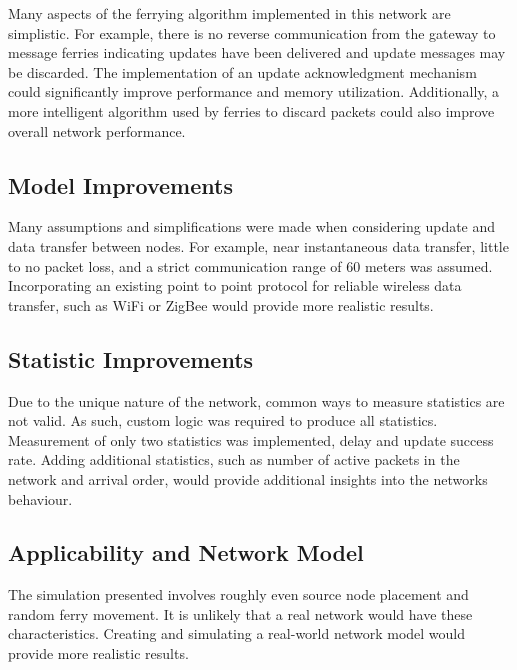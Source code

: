 Many aspects of the ferrying algorithm implemented in this network are simplistic.
For example, there is no reverse communication from the gateway to message ferries indicating updates have been delivered and update messages may be discarded.
The implementation of an update acknowledgment mechanism could significantly improve performance and memory utilization.
Additionally, a more intelligent algorithm used by ferries to discard packets could also improve overall network performance.

\subsection{Model Improvements}

Many assumptions and simplifications were made when considering update and data transfer between nodes.
For example, near instantaneous data transfer, little to no packet loss, and a strict communication range of 60 meters was assumed.
Incorporating an existing point to point protocol for reliable wireless data transfer, such as WiFi or ZigBee would provide more realistic results.

\subsection{Statistic Improvements}

Due to the unique nature of the network, common ways to measure statistics are not valid.
As such, custom logic was required to produce all statistics.
Measurement of only two statistics was implemented, delay and update success rate.
Adding additional statistics, such as number of active packets in the network and arrival order, would provide additional insights into the networks behaviour.

\subsection{Applicability and Network Model}

The simulation presented involves roughly even source node placement and random ferry movement.
It is unlikely that a real %
network would have these characteristics.
Creating and simulating a real-world network model would provide more realistic results.
